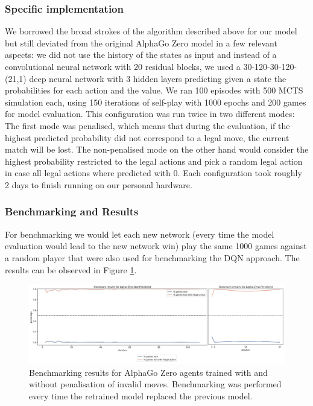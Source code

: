 \documentclass[12pt,a4paper]{article}
\begin{document}
\subsubsection{Specific implementation}
We borrowed the broad strokes of the algorithm described above for our model but still deviated from the original AlphaGo Zero model in a few relevant aspects: we did not use the history of the states as input and instead of a convolutional neural network with 20 residual blocks, we used a 30-120-30-120-(21,1) deep neural network with 3 hidden layers predicting given a state the probabilities for each action and the value. We ran 100 episodes with 500 MCTS simulation each, using 150 iterations of self-play with 1000 epochs and 200 games for model evaluation. This configuration was run twice in two different modes: The first mode was penalised, which means that during the evaluation, if the highest predicted probability did not correspond to a legal move, the current match will be lost. The non-penalised mode on the other hand would consider the highest probability restricted to the legal actions and pick a random legal action in case all legal actions where predicted with 0. Each configuration took roughly 2 days to finish running on our personal hardware.

\subsubsection{Benchmarking and Results}
For benchmarking we would let each new network (every time the model evaluation would lead to the new network win) play the same 1000 games against a random player that were also used for benchmarking the DQN approach. The results can be observed in Figure \ref{fig:alphazero}.

\begin{figure}
  \includegraphics[width=\linewidth]{img/alphazero.png}
  \centering 
  \caption{Benchmarking results for AlphaGo Zero agents trained with and without penalisation of invalid moves. Benchmarking was performed every time the retrained model replaced the previous model.}
  \label{fig:alphazero}
\end{figure}
\end{document}
